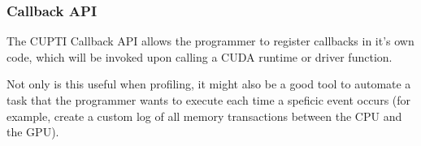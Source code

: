 \subsubsection{Callback API}
\label{sec:cuda:prof:callback}

The CUPTI Callback API allows the programmer to register callbacks in it's own code, which will be invoked upon calling a CUDA runtime or driver function.

Not only is this useful when profiling, it might also be a good tool to automate a task that the programmer wants to execute each time a speficic event occurs (for example, create a custom log of all memory transactions between the CPU and the GPU).